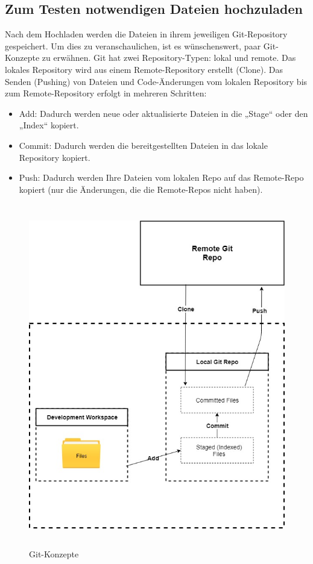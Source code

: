 \documentclass[a4paper,12pt,oneside]{book}
\begin{document}
\subsection{Zum Testen notwendigen Dateien hochzuladen}
Nach dem Hochladen werden die Dateien in ihrem jeweiligen Git-Repository gespeichert. Um dies zu veranschaulichen, ist es wünschenswert, paar Git-Konzepte zu erwähnen.
\newline
Git hat zwei Repository-Typen: lokal und remote. Das lokales Repository wird aus einem Remote-Repository erstellt (Clone). Das Senden (Pushing) von Dateien und Code-Änderungen vom lokalen Repository bis zum Remote-Repository erfolgt in mehreren Schritten: 
\begin{itemize}
	\item Add: Dadurch werden neue oder aktualisierte Dateien in die „Stage“ oder den „Index“ kopiert.
	\item Commit: Dadurch werden die bereitgestellten Dateien in das lokale Repository kopiert.
	\item Push: Dadurch werden Ihre Dateien vom lokalen Repo auf das Remote-Repo kopiert (nur die Änderungen, die die Remote-Repos nicht haben).
\end{itemize}
\begin{figure}[h!]
	\begin{center}
		\includegraphics[width=14cm, height=15cm]{Git-Konzept.jpg}
		\caption{Git-Konzepte} 
		\label{ Git-Konzepte} 
	\end{center}
\end{figure}
\end{document}
